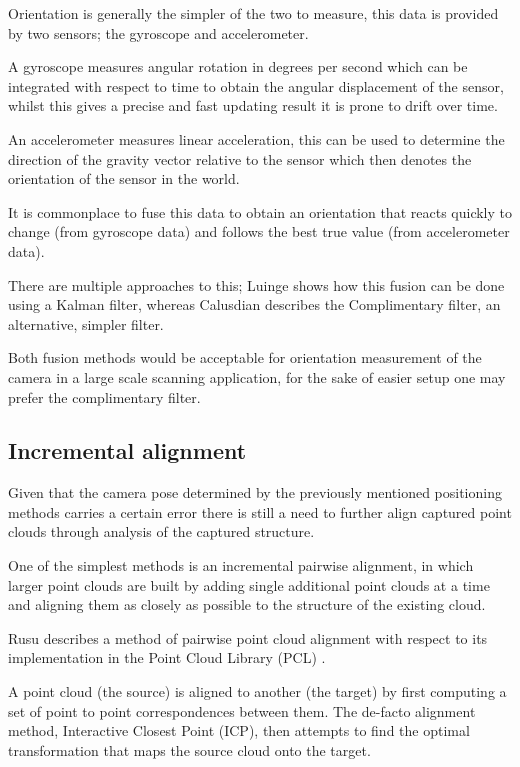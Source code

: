\documentclass{entcs}
\begin{document}
Orientation is generally the simpler of the two to measure, this data is
provided by two sensors; the gyroscope and accelerometer.

A gyroscope measures angular rotation in degrees per second which can be
integrated with respect to time to obtain the angular displacement of the
sensor, whilst this gives a precise and fast updating result it is prone to
drift over time.

An accelerometer measures linear acceleration, this can be used to determine the
direction of the gravity vector relative to the sensor which then denotes the
orientation of the sensor in the world.

It is commonplace to fuse this data to obtain an orientation that reacts quickly
to change (from gyroscope data) and follows the best true value (from
accelerometer data).

There are multiple approaches to this; Luinge \cite{Luinge1999} shows how
this fusion can be done using a Kalman filter, whereas Calusdian
\cite{Calusdian2011} describes the Complimentary filter, an alternative, simpler
filter.

Both fusion methods would be acceptable for orientation measurement of the
camera in a large scale scanning application, for the sake of easier setup one
may prefer the complimentary filter.

\subsection{Incremental alignment}

Given that the camera pose determined by the previously mentioned positioning
methods carries a certain error there is still a need to further align captured
point clouds through analysis of the captured structure.

One of the simplest methods is an incremental pairwise alignment, in which
larger point clouds are built by adding single additional point clouds at a time
and aligning them as closely as possible to the structure of the existing cloud.

Rusu describes a method of pairwise point cloud alignment
\cite{RusuDoctoralDissertation} with respect to its implementation in the Point
Cloud Library (PCL) \cite{Rusu_ICRA2011_PCL}.

A point cloud (the source) is aligned to another (the target) by first computing
a set of point to point correspondences between them. The de-facto alignment
method, Interactive Closest Point (ICP), then attempts to find the optimal
transformation that maps the source cloud onto the target.
\end{document}
